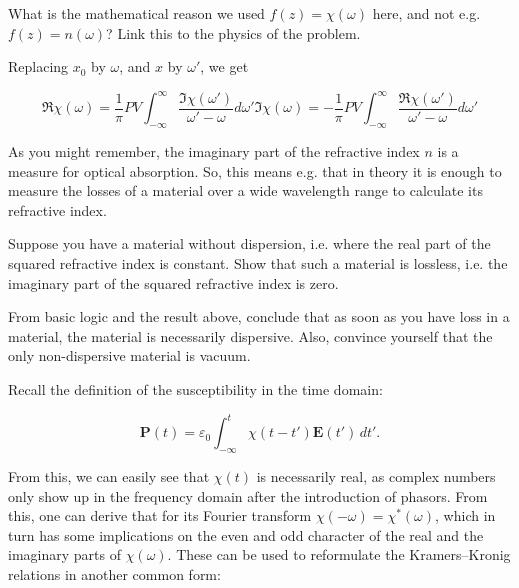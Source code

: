 \begin{exer}
What is the mathematical reason we used $f(z) = \chi(\omega)$ here, and not e.g. $f(z) = n(\omega)$? Link this to the physics of the problem. 
\end{exer}

Replacing $x_0$ by $\omega$, and $x$ by $\omega'$, we get

\begin{subequations} 
\begin{equation}
\Re \chi(\omega) = \frac{1}{\pi} PV \int_{- \infty}^{\infty} \frac{\Im
\chi(\omega')}{\omega'-\omega}d\omega'
\end{equation} 
\begin{equation}
\Im \chi(\omega) = -\frac{1}{\pi} PV \int_{- \infty}^{\infty} \frac{\Re
\chi(\omega')}{\omega'-\omega}d\omega'
\end{equation}
\label{eq-KK-2}
\end{subequations}

As you might remember, the imaginary part of the refractive index $n$ is a measure for optical absorption. So, this means e.g. that in theory it is enough to measure the losses of a material over a wide wavelength range to calculate its refractive index.

\begin{exer}
Suppose you have a material without dispersion, i.e. where the real part of the squared refractive index is constant. Show that such a material is lossless, i.e. the imaginary part of the squared refractive index is zero.
\end{exer}

\begin{exer}
From basic logic and the result above, conclude that as soon as you have loss in a material, the material is necessarily dispersive. Also, convince yourself that the only non-dispersive material is vacuum.
\end{exer}

Recall the definition of the susceptibility in the time domain:

\begin{equation}
\mathbf{P}(t)=\varepsilon_0 \int_{-\infty}^t \chi(t-t') \mathbf{E}(t')\, dt'.
\end{equation}

From this, we can easily see that $\chi(t)$ is necessarily real, as complex numbers only show up in the frequency domain after the introduction of phasors. From this, one can derive that for its Fourier transform $\chi(-\omega) = \chi^*(\omega)$, which in turn has some implications on the even and odd character of the real and the imaginary parts of $\chi(\omega)$. These can be used to reformulate the Kramers--Kronig relations in another common form:

